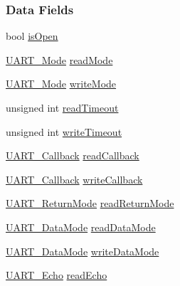 \subsubsection*{Data Fields}
\begin{DoxyCompactItemize}
\item 
bool \hyperlink{struct_u_a_r_t_e_u_s_c_i_a___object_a876bd31eb61666ec63ac78411407ce84}{is\+Open}
\item 
\hyperlink{_u_a_r_t_8h_a2507a620dba95cd20885c52494d19e90}{U\+A\+R\+T\+\_\+\+Mode} \hyperlink{struct_u_a_r_t_e_u_s_c_i_a___object_a19f25d2126d3ab9b46802d1d1e5b2394}{read\+Mode}
\item 
\hyperlink{_u_a_r_t_8h_a2507a620dba95cd20885c52494d19e90}{U\+A\+R\+T\+\_\+\+Mode} \hyperlink{struct_u_a_r_t_e_u_s_c_i_a___object_a300f14a42ac00aab851ba72d2d75eb84}{write\+Mode}
\item 
unsigned int \hyperlink{struct_u_a_r_t_e_u_s_c_i_a___object_a03908f18cc9a7c259a6145c9dac9f78d}{read\+Timeout}
\item 
unsigned int \hyperlink{struct_u_a_r_t_e_u_s_c_i_a___object_a72652cb4e609a19af8d8c32cc8ebc83c}{write\+Timeout}
\item 
\hyperlink{_u_a_r_t_8h_a44620a9d91e0357ebc6f0a79984d9e1e}{U\+A\+R\+T\+\_\+\+Callback} \hyperlink{struct_u_a_r_t_e_u_s_c_i_a___object_a48d94342a6819603b31ac41c4a487a03}{read\+Callback}
\item 
\hyperlink{_u_a_r_t_8h_a44620a9d91e0357ebc6f0a79984d9e1e}{U\+A\+R\+T\+\_\+\+Callback} \hyperlink{struct_u_a_r_t_e_u_s_c_i_a___object_a5f6b50178f7b8f8f0584ee303d1e5aa3}{write\+Callback}
\item 
\hyperlink{_u_a_r_t_8h_acb5a82843435a1b5d51b6c27028d914f}{U\+A\+R\+T\+\_\+\+Return\+Mode} \hyperlink{struct_u_a_r_t_e_u_s_c_i_a___object_aca4e5d32a4a4929026e578e9282f686f}{read\+Return\+Mode}
\item 
\hyperlink{_u_a_r_t_8h_a694090fdb166f94ac30b809f9cba87b8}{U\+A\+R\+T\+\_\+\+Data\+Mode} \hyperlink{struct_u_a_r_t_e_u_s_c_i_a___object_a5051d7c819bc1715f388d006810c3d9c}{read\+Data\+Mode}
\item 
\hyperlink{_u_a_r_t_8h_a694090fdb166f94ac30b809f9cba87b8}{U\+A\+R\+T\+\_\+\+Data\+Mode} \hyperlink{struct_u_a_r_t_e_u_s_c_i_a___object_ae591cb092a522c26513871cc3ebcc549}{write\+Data\+Mode}
\item 
\hyperlink{_u_a_r_t_8h_aac6a03c2e1d76f53e1d9d923dcdc24f2}{U\+A\+R\+T\+\_\+\+Echo} \hyperlink{struct_u_a_r_t_e_u_s_c_i_a___object_a94f56220b0db1f89455fbd5469679518}{read\+Echo}
\item 

\end{DoxyCompactItemize}
